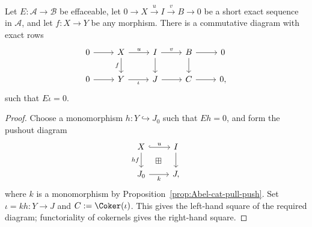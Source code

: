 \begin{lemma}\label{prop:erasable-aux}
	Let $E:\mathcal{A}\to\mathcal{B}$ be effaceable, let
	$0\to X\xrightarrow{u}I\xrightarrow{v}B\to0$ be a short exact sequence
	in $\mathcal{A}$, and let $f:X\to Y$ be any morphism. There is a
	commutative diagram with exact rows
	\begin{equation*}\begin{tikzcd}
			0 \arrow[r] & X \arrow[d, "f"'] \arrow[r, "u"] & I \arrow[r, "v"] \arrow[d] & B \arrow[d] \arrow[r] & 0 \\
			0 \arrow[r] & Y \arrow[r, "\iota"'] & J \arrow[r] & C \arrow[r] & 0 ,
	\end{tikzcd}\end{equation*}
	such that $E\iota=0$.
\end{lemma}
\begin{proof}
	Choose a monomorphism $h:Y\hookrightarrow J_0$ such that $Eh=0$, and form
	the pushout diagram
	\[\begin{tikzcd}
		X \arrow[hookrightarrow, r, "u"] \arrow[d, "hf"'] & I \arrow[d] \\
		J_0 \arrow[r, "k"'] & J \arrow[phantom, lu, "\boxplus" description] ,
	\end{tikzcd}\]
	where $k$ is a monomorphism by
	Proposition~\ref{prop:Abel-cat-pull-push}. Set $\iota=kh:Y\to J$ and
	$C:=\Coker(\iota)$. This gives the left-hand square of the required
	diagram; functoriality of cokernels gives the right-hand square.
\end{proof}

